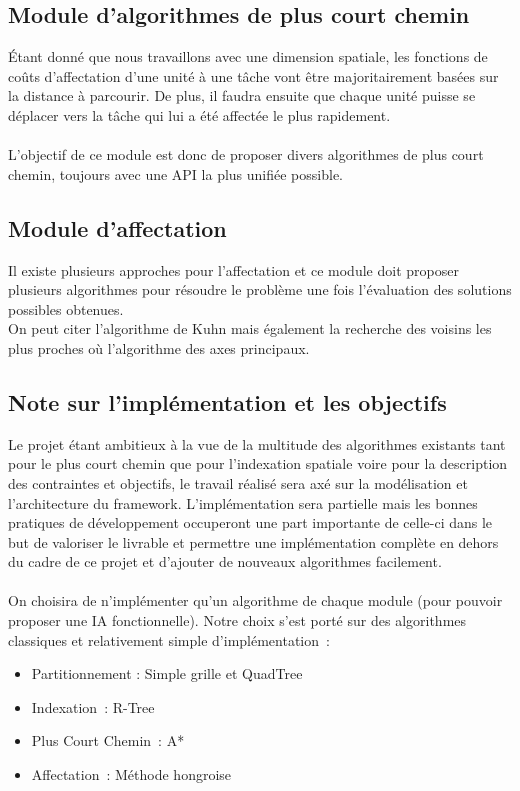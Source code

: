\subsection{Module d'algorithmes de plus court chemin}

Étant donné que nous travaillons avec une dimension spatiale, les fonctions de coûts d'affectation d'une unité à une tâche vont être majoritairement basées sur la distance à parcourir. De plus, il faudra ensuite que chaque unité puisse se déplacer vers la tâche qui lui a été affectée le plus rapidement.\\\\

L'objectif de ce module est donc de proposer divers algorithmes de plus court chemin, toujours avec une API la plus unifiée possible.

\subsection{Module d'affectation}

Il existe plusieurs approches pour l'affectation et ce module doit proposer plusieurs algorithmes pour résoudre le problème une fois l'évaluation des solutions possibles obtenues.\\
On peut citer l'algorithme de Kuhn mais également la recherche des voisins les plus proches où l'algorithme des axes principaux.

\subsection{Note sur l'implémentation et les objectifs}

Le projet étant ambitieux à la vue de la multitude des algorithmes existants tant pour le plus court chemin que pour l'indexation spatiale voire pour la description des contraintes et objectifs, le travail réalisé sera axé sur la modélisation et l'architecture du framework. L'implémentation sera partielle mais les bonnes pratiques de développement occuperont une part importante de celle-ci dans le but de valoriser le livrable et permettre une implémentation complète en dehors du cadre de ce projet et d'ajouter de nouveaux algorithmes facilement.\\\\

On choisira de n'implémenter qu'un algorithme de chaque module (pour pouvoir proposer une IA fonctionnelle). Notre choix s'est porté sur des algorithmes classiques et relativement simple d'implémentation :
\begin{itemize}
\item Partitionnement : Simple grille et QuadTree
\item Indexation : R-Tree
\item Plus Court Chemin : A*
\item Affectation : Méthode hongroise
\end{itemize}
